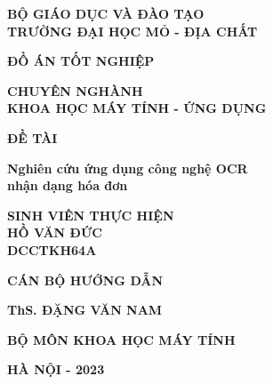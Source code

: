 \newpage
\thispagestyle{empty}
\begin{center}
    \vspace{-6pt} \textbf{\fontsize{18pt}{0}\selectfont BỘ GIÁO DỤC VÀ ĐÀO TẠO} \\
    \vspace{1.5pt}\textbf{\fontsize{18pt}{0}\selectfont TRƯỜNG ĐẠI HỌC MỎ - ĐỊA CHẤT}

    \vspace{4.0cm}
    \textbf{\fontsize{35pt}{0}\selectfont ĐỒ ÁN TỐT NGHIỆP} 

    \vspace{0.5cm}
    \textbf{\fontsize{18pt}{0}\selectfont CHUYÊN NGHÀNH \\ \vspace{0.1cm} KHOA HỌC MÁY TÍNH - ỨNG DỤNG} 

    \vspace{2.5cm}
    \textbf{\fontsize{24pt}{0}\selectfont ĐỀ TÀI} 

    \vspace{0.5cm}
    \textbf{\fontsize{18pt}{0}\selectfont Nghiên cứu ứng dụng công nghệ OCR \\ \vspace{0.1cm}
nhận dạng hóa đơn}
\end{center}

\vspace{1.5cm}
\begin{multicols}{2}
    \begin{center}
        \noindent
        \textbf{\fontsize{15pt}{0}\selectfont SINH VIÊN THỰC HIỆN} \\
        \vspace{0.1cm}\textbf{\fontsize{15pt}{0}\selectfont HỒ VĂN ĐỨC} \\
        \vspace{0.1cm}\textbf{\fontsize{15pt}{0}\selectfont DCCTKH64A}
    \end{center}
    
    \columnbreak
    
    \begin{center}
        \noindent
        \textbf{\fontsize{15pt}{0}\selectfont CÁN BỘ HƯỚNG DẪN} 

        \vspace{0.1cm}\textbf{\fontsize{15pt}{0}\selectfont ThS. ĐẶNG VĂN NAM}

        \vspace{0.1cm}\textbf{\fontsize{15pt}{0}\selectfont BỘ MÔN KHOA HỌC MÁY TÍNH}
    \end{center}
\end{multicols}

\vspace{1.5cm}
\begin{center}
    \textbf{\fontsize{18pt}{0}\selectfont HÀ NỘI - 2023}
\end{center}